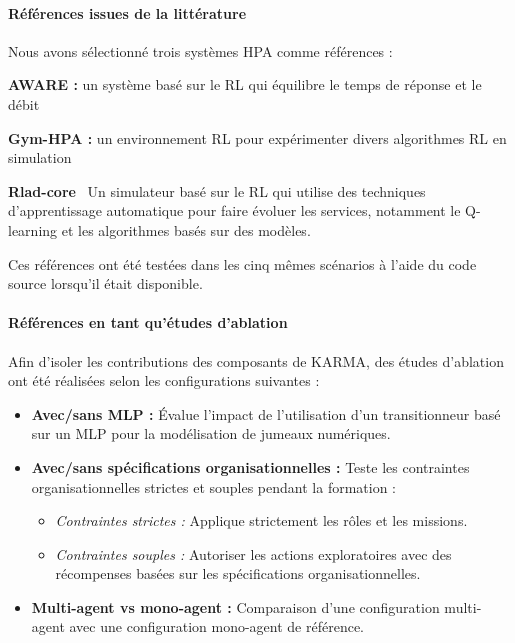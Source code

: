 \paragraph{\textbf{Références issues de la littérature}}
%
\noindent Nous avons sélectionné trois systèmes HPA comme références :
\begin{enumerate*}[label=\textbf{\arabic*)}, itemjoin={;\quad }]
    \item \textbf{AWARE :} un système basé sur le RL qui équilibre le temps de réponse et le débit~\cite{aware2023}
    \item \textbf{Gym-HPA :} un environnement RL pour expérimenter divers algorithmes RL en simulation~\cite{gymhpa2022}
    \item \textbf{Rlad-core}~\cite{Rossi2019} Un simulateur basé sur le RL qui utilise des techniques d'apprentissage automatique pour faire évoluer les services, notamment le Q-learning et les algorithmes basés sur des modèles.
\end{enumerate*}

Ces références ont été testées dans les cinq mêmes scénarios à l'aide du code source lorsqu'il était disponible.

\paragraph{\textbf{Références en tant qu'études d'ablation}}

\noindent Afin d'isoler les contributions des composants de KARMA, des études d'ablation ont été réalisées selon les configurations suivantes :
%
\begin{itemize}
    \item \textbf{Avec/sans MLP :} Évalue l'impact de l'utilisation d'un transitionneur basé sur un MLP pour la modélisation de jumeaux numériques.
    \item \textbf{Avec/sans spécifications organisationnelles :} Teste les contraintes organisationnelles strictes et souples pendant la formation :
        \begin{itemize}
            \item \textit{Contraintes strictes :} Applique strictement les rôles et les missions.
            \item \textit{Contraintes souples :} Autoriser les actions exploratoires avec des récompenses basées sur les spécifications organisationnelles.
        \end{itemize}
    \item \textbf{Multi-agent vs mono-agent :} Comparaison d'une configuration multi-agent avec une configuration mono-agent de référence.
\end{itemize}

